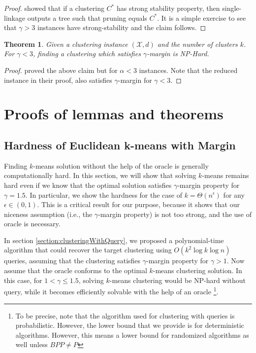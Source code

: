 \documentclass{article}
\newcommand{\mc}{\mathcal}
\newtheorem{theorem}{Theorem}
\begin{document}
\begin{proof}
\cite{balcan2008discriminative} showed that if a clustering $C^*$ has strong stability property, then single-linkage outputs a tree such that pruning equals $C^*$. It is a simple exercise to see that $\gamma > 3$ instances have strong-stability and the claim follows.  
\end{proof}


\begin{theorem}
\label{thm:lowerCenterMetric}
Given a clustering instance $(\mc X, d)$ and the number of clusters $k$. For $\gamma < 3$, finding a clustering which satisfies $\gamma$-margin is NP-Hard.
\end{theorem}
\begin{proof}
\cite{awasthi2012center} proved the above claim but for $\alpha < 3$ instances. Note that the reduced instance in their proof, also satisfies $\gamma$-margin for $\gamma < 3$. 
\end{proof}


\section{Proofs of lemmas and theorems}
\subsection{Hardness of Euclidean k-means with Margin}

Finding $k$-means solution without the help of the oracle is generally computationally hard. In this section, we will show that solving $k$-means remains hard even if we know that the optimal solution satisfies $\gamma$-margin property for $\gamma=1.5$. In particular, we show the hardness for the case of $k=\Theta(n^\epsilon)$ for any $\epsilon\in (0,1)$. This is a critical result for our purpose, because it shows that our niceness assumption (i.e., the $\gamma$-margin property) is not too strong, and the use of oracle is necessary.

In section \ref{section:clusteringWithQuery}, we proposed a polynomial-time algorithm that could recover the target clustering using $O(k^2\log k \log n)$ queries, assuming that the clustering satisfies $\gamma$-margin property for $\gamma>1$. Now assume that the oracle conforms to the optimal $k$-means clustering solution. In this case, for $1<\gamma\le 1.5$, solving $k$-means clustering would be NP-hard without query, while it becomes efficiently solvable with the help of an oracle \footnote{To be precise, note that the algorithm used for clustering with queries is probabilistic. However, the lower bound that we provide is for deterministic algorithms. However, this means a lower bound for randomized algorithms as well unless $BPP\neq P$}. 
\end{document}
